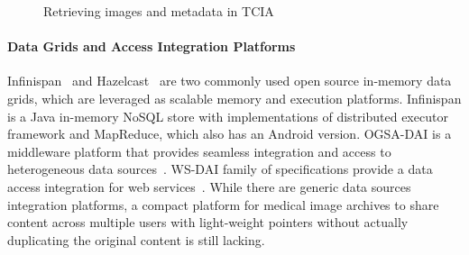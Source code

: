 \documentclass[letterpaper, 10 pt, conference]{ieeeconf}  %
\begin{document}
\begin{figure}[!h]
	\begin{center}
		\vspace{-10pt}
		
	\end{center}
	\caption{Retrieving images and metadata in TCIA}
	\label{fig:methods}
	\vspace{-15pt}
\end{figure}


\paragraph*{\textbf{Data Grids and Access Integration Platforms}}
Infinispan~\cite{marchioni2012infinispan} and Hazelcast~\cite{hazelcast} are two commonly used open source in-memory data grids, which are leveraged as scalable memory and execution platforms. Infinispan is a Java in-memory NoSQL store with implementations of distributed executor framework and MapReduce, which also has an Android version. OGSA-DAI is a middleware platform that provides seamless integration and access to heterogeneous data sources~\cite{antonioletti2005design}. WS-DAI family of specifications provide a data access integration for web services~\cite{antonioletti2006ws}. While there are generic data sources integration platforms, a compact platform for medical image archives to share content across multiple users with light-weight pointers without actually duplicating the original content is still lacking.
\end{document}

